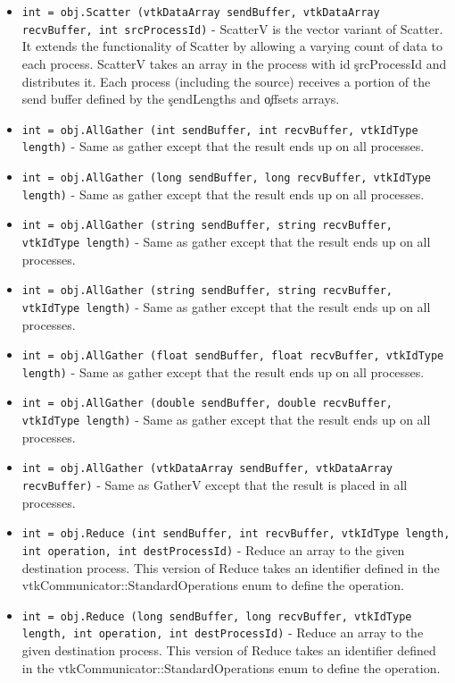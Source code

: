 \begin{itemize}
\item  \verb|int = obj.Scatter (vtkDataArray sendBuffer, vtkDataArray recvBuffer, int srcProcessId)| -  ScatterV is the vector variant of Scatter.  It extends the functionality of
 Scatter by allowing a varying count of data to each process.
 ScatterV takes an array in the process with id \c srcProcessId and
 distributes it.  Each process (including the source) receives a portion of
 the send buffer defined by the \c sendLengths and \c offsets arrays.

\item  \verb|int = obj.AllGather (int sendBuffer, int recvBuffer, vtkIdType length)| -  Same as gather except that the result ends up on all processes.

\item  \verb|int = obj.AllGather (long sendBuffer, long recvBuffer, vtkIdType length)| -  Same as gather except that the result ends up on all processes.

\item  \verb|int = obj.AllGather (string sendBuffer, string recvBuffer, vtkIdType length)| -  Same as gather except that the result ends up on all processes.

\item  \verb|int = obj.AllGather (string sendBuffer, string recvBuffer, vtkIdType length)| -  Same as gather except that the result ends up on all processes.

\item  \verb|int = obj.AllGather (float sendBuffer, float recvBuffer, vtkIdType length)| -  Same as gather except that the result ends up on all processes.

\item  \verb|int = obj.AllGather (double sendBuffer, double recvBuffer, vtkIdType length)| -  Same as gather except that the result ends up on all processes.

\item  \verb|int = obj.AllGather (vtkDataArray sendBuffer, vtkDataArray recvBuffer)| -  Same as GatherV except that the result is placed in all processes.

\item  \verb|int = obj.Reduce (int sendBuffer, int recvBuffer, vtkIdType length, int operation, int destProcessId)| -  Reduce an array to the given destination process.  This version of Reduce
 takes an identifier defined in the
 vtkCommunicator::StandardOperations enum to define the operation.

\item  \verb|int = obj.Reduce (long sendBuffer, long recvBuffer, vtkIdType length, int operation, int destProcessId)| -  Reduce an array to the given destination process.  This version of Reduce
 takes an identifier defined in the
 vtkCommunicator::StandardOperations enum to define the operation.


\end{itemize}
